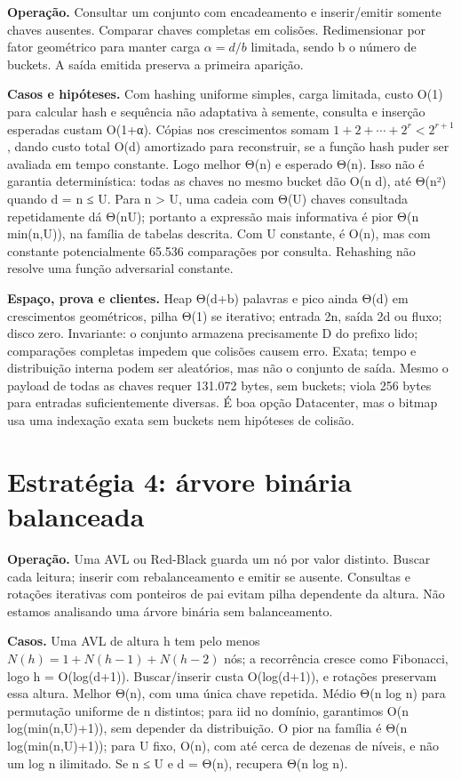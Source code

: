 \documentclass[
  brazilian,
  11pt,
  a4paper,
]{article}
\let\oldsection\section
\renewcommand{\section}{\Needspace{6\baselineskip}\oldsection}
\begin{document}
\textbf{Operação.} Consultar um conjunto com encadeamento e
inserir/emitir somente chaves ausentes. Comparar chaves completas em
colisões. Redimensionar por fator geométrico para manter carga
\(\alpha=d/b\) limitada, sendo b o número de buckets. A saída emitida
preserva a primeira aparição.

\textbf{Casos e hipóteses.} Com hashing uniforme simples, carga
limitada, custo O(1) para calcular hash e sequência não adaptativa à
semente, consulta e inserção esperadas custam O(1+α). Cópias nos
crescimentos somam \(1+2+\cdots+2^r<2^{r+1}\), dando custo total O(d)
amortizado para reconstruir, se a função hash puder ser avaliada em
tempo constante. Logo melhor Θ(n) e esperado Θ(n). Isso não é garantia
determinística: todas as chaves no mesmo bucket dão O(n d), até Θ(n²)
quando d = n ≤ U. Para n \textgreater{} U, uma cadeia com Θ(U) chaves
consultada repetidamente dá Θ(nU); portanto a expressão mais informativa
é pior Θ(n min(n,U)), na família de tabelas descrita. Com U constante, é
O(n), mas com constante potencialmente 65.536 comparações por consulta.
Rehashing não resolve uma função adversarial constante.

\textbf{Espaço, prova e clientes.} Heap Θ(d+b) palavras e pico ainda
Θ(d) em crescimentos geométricos, pilha Θ(1) se iterativo; entrada 2n,
saída 2d ou fluxo; disco zero. Invariante: o conjunto armazena
precisamente D do prefixo lido; comparações completas impedem que
colisões causem erro. Exata; tempo e distribuição interna podem ser
aleatórios, mas não o conjunto de saída. Mesmo o payload de todas as
chaves requer 131.072 bytes, sem buckets; viola 256 bytes para entradas
suficientemente diversas. É boa opção Datacenter, mas o bitmap usa uma
indexação exata sem buckets nem hipóteses de colisão.

\section{Estratégia 4: árvore binária
balanceada}\label{estratuxe9gia-4-uxe1rvore-binuxe1ria-balanceada}

\textbf{Operação.} Uma AVL ou Red-Black guarda um nó por valor distinto.
Buscar cada leitura; inserir com rebalanceamento e emitir se ausente.
Consultas e rotações iterativas com ponteiros de pai evitam pilha
dependente da altura. Não estamos analisando uma árvore binária sem
balanceamento.

\textbf{Casos.} Uma AVL de altura h tem pelo menos
\(N(h)=1+N(h-1)+N(h-2)\) nós; a recorrência cresce como Fibonacci, logo
h = O(log(d+1)). Buscar/inserir custa O(log(d+1)), e rotações preservam
essa altura. Melhor Θ(n), com uma única chave repetida. Médio Θ(n log n)
para permutação uniforme de n distintos; para iid no domínio, garantimos
O(n log(min(n,U)+1)), sem depender da distribuição. O pior na família é
Θ(n log(min(n,U)+1)); para U fixo, O(n), com até cerca de dezenas de
níveis, e não um log n ilimitado. Se n ≤ U e d = Θ(n), recupera Θ(n log
n).
\end{document}
